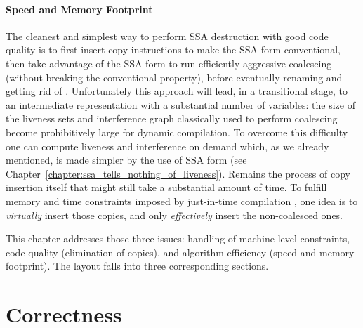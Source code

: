\paragraph{Speed and Memory Footprint}
The cleanest and simplest way to perform SSA destruction with good code quality is to first insert copy instructions to make the SSA form conventional, then take advantage of the SSA form to run efficiently aggressive coalescing (without breaking the conventional property), before eventually renaming \phiwebs\index{\phiweb} and getting rid of \phifuns. 
Unfortunately this approach will lead, in a transitional stage, to an intermediate representation with a substantial number of variables: 
the size of the liveness sets and interference graph classically used to perform coalescing become prohibitively large for dynamic compilation. 
To overcome this difficulty one can compute liveness and interference on demand which, as we already mentioned, is made simpler by the use of SSA form (see Chapter~\ref{chapter:ssa_tells_nothing_of_liveness}). 
Remains the process of copy insertion itself that might still take a substantial amount of time. 
To fulfill memory and time constraints imposed by just-in-time compilation , one idea is to \emph{virtually} insert those copies, and only \emph{effectively} insert the non-coalesced ones.

This chapter addresses those three issues: 
handling of machine level constraints, code quality (elimination of copies), and algorithm efficiency (speed and memory footprint). 
The layout falls into three corresponding sections.

\section{Correctness}

